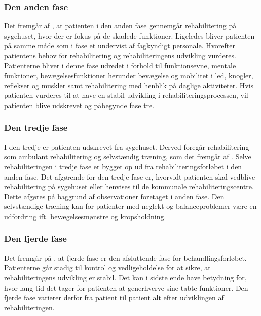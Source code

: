 \subsubsection{Den anden fase}
Det fremgår af , at patienten i den anden fase gennemgår rehabilitering på sygehuset, hvor der er fokus på de skadede funktioner. Ligeledes bliver patienten på samme måde som i fase et undervist af fagkyndigt personale. Hvorefter patientens behov for rehabilitering og rehabiliteringens udvikling vurderes. Patienterne bliver i denne fase udredet i forhold til funktionsevne, mentale funktioner, bevægelsesfunktioner herunder bevægelse og mobilitet i led, knogler, reflekser og muskler samt rehabilitering med henblik på daglige aktiviteter. Hvis patienten vurderes til at have en stabil udvikling i rehabiliteringsprocessen, vil patienten blive udskrevet og påbegynde fase tre. \cite{Sundhedsstyrelsen2011a}


\subsubsection{Den tredje fase}
I den tredje er patienten udskrevet fra sygehuset. Derved foregår rehabilitering som ambulant rehabilitering og selvstændig træning, som det fremgår af .  Selve rehabiliteringen i tredje fase er bygget op ud fra rehabiliteringsforløbet i den anden fase. Det afgørende for den tredje fase er, hvorvidt patienten skal vedblive rehabilitering på sygehuset eller henvises til de kommunale rehabiliteringscentre. Dette afgøres på baggrund af observationer foretaget i anden fase. Den selvstændige træning kan for patienter med neglekt og balanceproblemer være en udfordring ift. bevægelsesmønstre og kropsholdning. \cite{Sundhedsstyrelsen2011a}

\subsubsection{Den fjerde fase}
Det fremgår på , at fjerde fase er den afsluttende fase for behandlingsforløbet. Patienterne går stadig til kontrol og vedligeholdelse for at sikre, at rehabiliteringens udvikling er stabil. Det kan i sidste ende have betydning for, hvor lang tid det tager for patienten at generhverve sine tabte funktioner. Den fjerde fase varierer derfor fra patient til patient alt efter udviklingen af rehabiliteringen.\cite{Sundhedsstyrelsen2011a} \\

